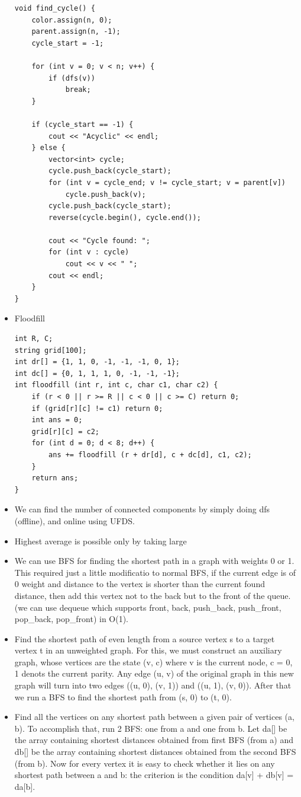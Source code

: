 \documentclass[8pt, a4paper, oneside, twocolumn]{extarticle}
\begin{document}
\begin{itemize}
\begin{verbatim}
void find_cycle() {
    color.assign(n, 0);
    parent.assign(n, -1);
    cycle_start = -1;

    for (int v = 0; v < n; v++) {
        if (dfs(v))
            break;
    }

    if (cycle_start == -1) {
        cout << "Acyclic" << endl;
    } else {
        vector<int> cycle;
        cycle.push_back(cycle_start);
        for (int v = cycle_end; v != cycle_start; v = parent[v])
            cycle.push_back(v);
        cycle.push_back(cycle_start);
        reverse(cycle.begin(), cycle.end());

        cout << "Cycle found: ";
        for (int v : cycle)
            cout << v << " ";
        cout << endl;
    }
}
    \end{verbatim}
    \item Floodfill
    \begin{verbatim}
int R, C;
string grid[100];
int dr[] = {1, 1, 0, -1, -1, -1, 0, 1};
int dc[] = {0, 1, 1, 1, 0, -1, -1, -1};
int floodfill (int r, int c, char c1, char c2) {
    if (r < 0 || r >= R || c < 0 || c >= C) return 0;
    if (grid[r][c] != c1) return 0;
    int ans = 0;
    grid[r][c] = c2;
    for (int d = 0; d < 8; d++) {
        ans += floodfill (r + dr[d], c + dc[d], c1, c2);
    }
    return ans;
}
    \end{verbatim}
    \item We can find the number of connected components by simply doing dfs (offline), and online using UFDS.
    \item Highest average is possible only by taking large 
    \item We can use BFS for finding the shortest path in a graph with weights 0 or 1. This required just a little modificatio to normal BFS, if the current edge is of 0 weight and distance to the vertex is shorter than the current found distance, then add this vertex not to the back but to the front of the queue. (we can use dequeue which supports front, back, push\_{}back, push\_{}front, pop\_{}back, pop\_{}front) in O(1).
    \item Find the shortest path of even length from a source vertex s to a target vertex t in an unweighted graph. For this, we must construct an auxiliary graph, whose vertices are the state (v, c) where v is the current node, c = 0, 1 denots the current parity. Any edge (u, v) of the original graph in this new graph will turn into two edges ((u, 0), (v, 1)) and ((u, 1), (v, 0)). After that we run a BFS to find the shortest path from (s, 0) to (t, 0).
    \item Find all the vertices on any shortest path between a given pair of vertices (a, b). To accomplish that, run 2 BFS: one from a and one from b. Let da[] be the array containing shortest distances obtained from first BFS (from a) and db[] be the array containing shortest distances obtained from the second BFS (from b). Now for every vertex it is easy to check whether it lies on any shortest path between a and b: the criterion is the condition da[v] + db[v] = da[b].

\end{itemize}
\end{document}
